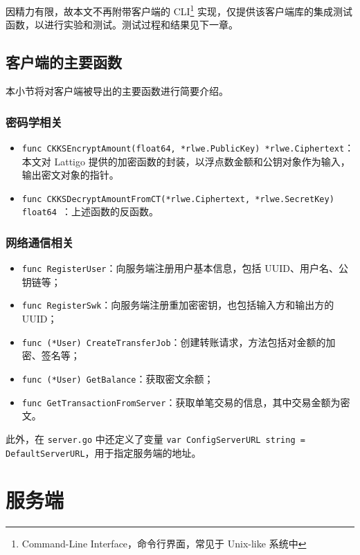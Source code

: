 因精力有限，故本文不再附带客户端的 CLI\footnote{Command-Line Interface，命令行界面，常见于 Unix-like 系统中} 实现，仅提供该客户端库的集成测试函数，以进行实验和测试。测试过程和结果见下一章。

\subsection{客户端的主要函数}

本小节将对客户端被导出的主要函数进行简要介绍。

\subsubsection{密码学相关}

\begin{itemize}
    \item \verb|func CKKSEncryptAmount(float64, *rlwe.PublicKey) *rlwe.Ciphertext|：本文对 Lattigo 提供的加密函数的封装，以浮点数金额和公钥对象作为输入，输出密文对象的指针。
    \item \verb|func CKKSDecryptAmountFromCT(*rlwe.Ciphertext, *rlwe.SecretKey) float64 |：上述函数的反函数。
\end{itemize}

\subsubsection{网络通信相关}

\begin{itemize}
    \item \verb|func RegisterUser|：向服务端注册用户基本信息，包括 UUID、用户名、公钥链等；
    \item \verb|func RegisterSwk|：向服务端注册重加密密钥，也包括输入方和输出方的 UUID；
    \item \verb|func (*User) CreateTransferJob|：创建转账请求，方法包括对金额的加密、签名等；
    \item \verb|func (*User) GetBalance|：获取密文余额；
    \item \verb|func GetTransactionFromServer|：获取单笔交易的信息，其中交易金额为密文。
\end{itemize}

此外，在 \verb|server.go| 中还定义了变量 \verb|var ConfigServerURL string = DefaultServerURL|，用于指定服务端的地址。

\section{服务端}

